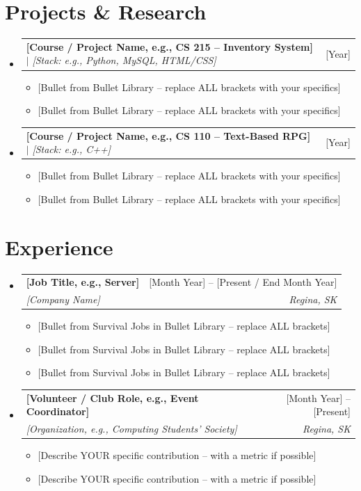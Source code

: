 \documentclass[letterpaper,11pt]{article}
\makeatletter
\newcommand{\resumeItem}[1]{
  \item\small{{#1 \vspace{-2pt}}}
}
\newcommand{\resumeSubheading}[4]{
  \vspace{-2pt}\item
    \begin{tabular*}{0.97\textwidth}[t]{l@{\extracolsep{\fill}}r}
      \textbf{#1} & #2 \\
      \textit{\small#3} & \textit{\small #4} \\
    \end{tabular*}\vspace{-7pt}
}
\newcommand{\resumeProjectHeading}[2]{
    \item
    \begin{tabular*}{0.97\textwidth}{l@{\extracolsep{\fill}}r}
      \small#1 & #2 \\
    \end{tabular*}\vspace{-7pt}
}
\newcommand{\resumeSubHeadingListStart}{\begin{itemize}[leftmargin=0.15in, label={}]}
\newcommand{\resumeSubHeadingListEnd}{\end{itemize}}
\newcommand{\resumeItemListStart}{\begin{itemize}}
\newcommand{\resumeItemListEnd}{\end{itemize}\vspace{-5pt}}
\makeatother
\begin{document}
\section{Projects \& Research}
    \resumeSubHeadingListStart

      \resumeProjectHeading
          {\textbf{[Course / Project Name, e.g., CS 215 -- Inventory System]} $|$ \emph{[Stack: e.g., Python, MySQL, HTML/CSS]}}{[Year]}
          \resumeItemListStart
            \resumeItem{[Bullet from Bullet Library -- replace ALL brackets with your specifics]}
            \resumeItem{[Bullet from Bullet Library -- replace ALL brackets with your specifics]}
          \resumeItemListEnd

      \resumeProjectHeading
          {\textbf{[Course / Project Name, e.g., CS 110 -- Text-Based RPG]} $|$ \emph{[Stack: e.g., C++]}}{[Year]}
          \resumeItemListStart
            \resumeItem{[Bullet from Bullet Library -- replace ALL brackets with your specifics]}
            \resumeItem{[Bullet from Bullet Library -- replace ALL brackets with your specifics]}
          \resumeItemListEnd

    \resumeSubHeadingListEnd


\section{Experience}
  \resumeSubHeadingListStart

    \resumeSubheading
      {[Job Title, e.g., Server]}{[Month Year] -- [Present / End Month Year]}
      {[Company Name]}{Regina, SK}
      \resumeItemListStart
        \resumeItem{[Bullet from Survival Jobs in Bullet Library -- replace ALL brackets]}
        \resumeItem{[Bullet from Survival Jobs in Bullet Library -- replace ALL brackets]}
        \resumeItem{[Bullet from Survival Jobs in Bullet Library -- replace ALL brackets]}
      \resumeItemListEnd

    \resumeSubheading
      {[Volunteer / Club Role, e.g., Event Coordinator]}{[Month Year] -- [Present]}
      {[Organization, e.g., Computing Students' Society]}{Regina, SK}
      \resumeItemListStart
        \resumeItem{[Describe YOUR specific contribution -- with a metric if possible]}
        \resumeItem{[Describe YOUR specific contribution -- with a metric if possible]}
      \resumeItemListEnd

  \resumeSubHeadingListEnd
\end{document}
